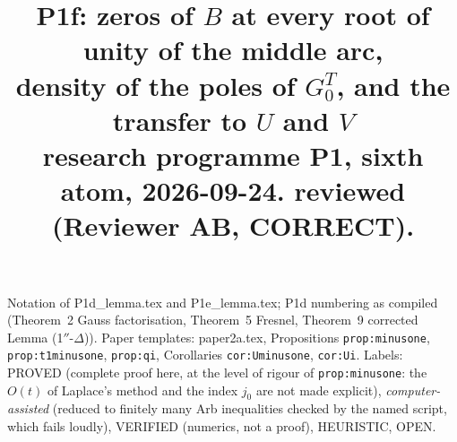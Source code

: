 \documentclass[11pt]{article}
\title{P1f: zeros of $B$ at every root of unity of the middle arc,\\ density of the poles of $G^T_0$, and the transfer to $U$ and $V$\\ \small research programme P1, sixth atom, 2026-09-24. reviewed (Reviewer AB, CORRECT).}
\date{}
\theoremstyle{definition}\newtheorem{definition}[theorem]{Definition}
\theoremstyle{remark}\newtheorem{remark}[theorem]{Remark}
\begin{document}
\maketitle

Notation of P1d\_lemma.tex and P1e\_lemma.tex; P1d numbering as compiled (Theorem~2 Gauss factorisation, Theorem~5 Fresnel, Theorem~9 corrected Lemma (1$''$-$\Delta$)). Paper templates: paper2a.tex, Propositions \texttt{prop:minusone}, \texttt{prop:t1minusone}, \texttt{prop:qi}, Corollaries \texttt{cor:Uminusone}, \texttt{cor:Ui}.
Labels: PROVED (complete proof here, at the level of rigour of \texttt{prop:minusone}: the $O(t)$ of Laplace's method and the index $j_0$ are not made explicit), \emph{computer-assisted} (reduced to finitely many Arb inequalities checked by the named script, which fails loudly), VERIFIED (numerics, not a proof), HEURISTIC, OPEN.
\end{document}
